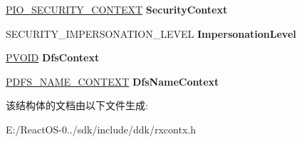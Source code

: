 \begin{DoxyCompactItemize}
\mbox{\label{struct___n_t___c_r_e_a_t_e___p_a_r_a_m_e_t_e_r_s_a3e229c298cb40ee8b9cc1de389433e3d}} 
\hyperlink{struct___i_o___s_e_c_u_r_i_t_y___c_o_n_t_e_x_t}{P\+I\+O\+\_\+\+S\+E\+C\+U\+R\+I\+T\+Y\+\_\+\+C\+O\+N\+T\+E\+XT} {\bfseries Security\+Context}
\item 
\mbox{\label{struct___n_t___c_r_e_a_t_e___p_a_r_a_m_e_t_e_r_s_a97661ad576196d3f5541225d8c9e21c3}} 
S\+E\+C\+U\+R\+I\+T\+Y\+\_\+\+I\+M\+P\+E\+R\+S\+O\+N\+A\+T\+I\+O\+N\+\_\+\+L\+E\+V\+EL {\bfseries Impersonation\+Level}
\item 
\mbox{\label{struct___n_t___c_r_e_a_t_e___p_a_r_a_m_e_t_e_r_s_a8d89c696e2e783ae9dc08d73b6678039}} 
\hyperlink{interfacevoid}{P\+V\+O\+ID} {\bfseries Dfs\+Context}
\item 
\mbox{\label{struct___n_t___c_r_e_a_t_e___p_a_r_a_m_e_t_e_r_s_ad540632f40a687d8e80a9021350dee26}} 
\hyperlink{struct___d_f_s___n_a_m_e___c_o_n_t_e_x_t__}{P\+D\+F\+S\+\_\+\+N\+A\+M\+E\+\_\+\+C\+O\+N\+T\+E\+XT} {\bfseries Dfs\+Name\+Context}
\end{DoxyCompactItemize}


该结构体的文档由以下文件生成\+:\begin{DoxyCompactItemize}
\item 
E\+:/\+React\+O\+S-\/0../sdk/include/ddk/rxcontx.\+h\end{DoxyCompactItemize}
